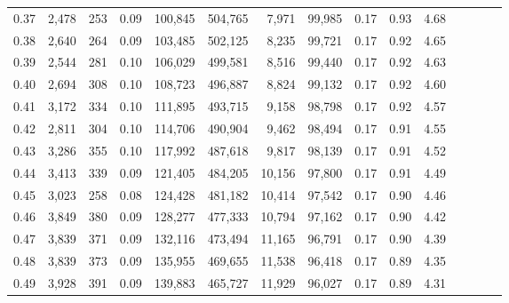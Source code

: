 \begin{tabular}{rrrcrrrrrrrrrrr}
0.37 &   2,478 &    253 &                                       0.09 &  100,845 &  504,765 &    7,971 &   99,985 &  0.17 &  0.93 &                         4.68 \\
0.38 &   2,640 &    264 &                                       0.09 &  103,485 &  502,125 &    8,235 &   99,721 &  0.17 &  0.92 &                         4.65 \\
0.39 &   2,544 &    281 &                                       0.10 &  106,029 &  499,581 &    8,516 &   99,440 &  0.17 &  0.92 &                         4.63 \\
0.40 &   2,694 &    308 &                                       0.10 &  108,723 &  496,887 &    8,824 &   99,132 &  0.17 &  0.92 &                         4.60 \\
0.41 &   3,172 &    334 &                                       0.10 &  111,895 &  493,715 &    9,158 &   98,798 &  0.17 &  0.92 &                         4.57 \\
0.42 &   2,811 &    304 &                                       0.10 &  114,706 &  490,904 &    9,462 &   98,494 &  0.17 &  0.91 &                         4.55 \\
0.43 &   3,286 &    355 &                                       0.10 &  117,992 &  487,618 &    9,817 &   98,139 &  0.17 &  0.91 &                         4.52 \\
0.44 &   3,413 &    339 &                                       0.09 &  121,405 &  484,205 &   10,156 &   97,800 &  0.17 &  0.91 &                         4.49 \\
0.45 &   3,023 &    258 &                                       0.08 &  124,428 &  481,182 &   10,414 &   97,542 &  0.17 &  0.90 &                         4.46 \\
0.46 &   3,849 &    380 &                                       0.09 &  128,277 &  477,333 &   10,794 &   97,162 &  0.17 &  0.90 &                         4.42 \\
0.47 &   3,839 &    371 &                                       0.09 &  132,116 &  473,494 &   11,165 &   96,791 &  0.17 &  0.90 &                         4.39 \\
0.48 &   3,839 &    373 &                                       0.09 &  135,955 &  469,655 &   11,538 &   96,418 &  0.17 &  0.89 &                         4.35 \\
0.49 &   3,928 &    391 &                                       0.09 &  139,883 &  465,727 &   11,929 &   96,027 &  0.17 &  0.89 &                         4.31 \\

\end{tabular}
